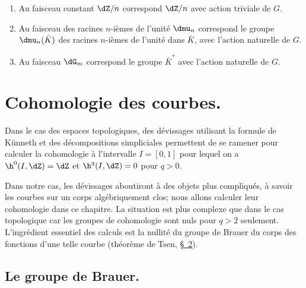 \begin{sourceexampledotdash}[Exemples]\label{I:2-4-5}

\begin{enumerate}[\indent a)]
  \item Au faisceau constant $\dZ/n$ correspond $\dZ/n$ avec action triviale de 
    $G$. 
  \item Au faisceau des racines $n$-ièmes de l'unité $\dmu_n$ correspond 
    le groupe $\dmu_n(\bar K)$ des racines $n$-ièmes de l'unité dans 
    $\bar K$, avec l'action naturelle de $G$.
  \item Au faisceau $\dG_m$ correspond le groupe $\bar K^*$ avec l'action 
    naturelle de $G$.
\end{enumerate}
\end{sourceexampledotdash}




















\section{Cohomologie des courbes.}\label{I:3}

Dans le cas des espaces topologiques, des dévissages utilisant la formule de 
Künneth et des décompositions simpliciales permettent de se ramener pour 
calculer la cohomologie à l'intervalle $I=[0,1]$ pour lequel on a 
$\h^0(I,\dZ)=\dZ$ et $\h^q(I,\dZ)=0$ pour $q>0$. 

Dans notre cas, les dévissages aboutiront à des objets plus compliqués, 
à savoir les courbes sur un corps algébriquement clos; nous allons calculer 
leur cohomologie dans ce chapitre. La situation est plus complexe que dans le 
cas topologique car les groupes de cohomologie sont nuls pour $q>2$ seulement. 
L'ingrédient essentiel des calculs est la nullité du groupe de Brauer du 
corps des fonctions d'une telle courbe (théorème de Tsen, \hyperref[I:3-2]{\S~2}). 










\subsection{Le groupe de Brauer.}\label{I:3-1}

